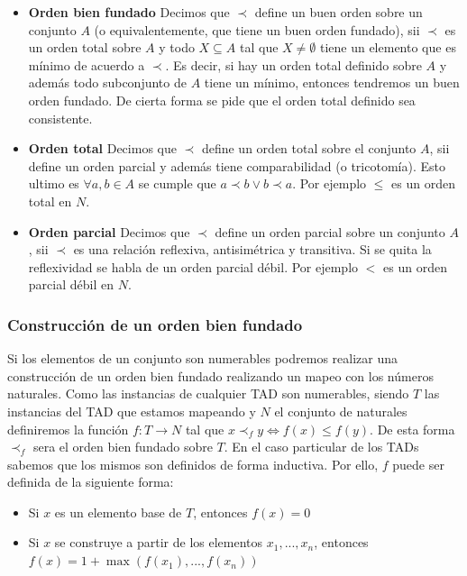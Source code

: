 \documentclass[10pt, a4paper]{report}
\begin{document}
\begin{itemize}
 \item \textbf{Orden bien fundado} Decimos que $\prec$ define un buen orden sobre un conjunto $A$ (o equivalentemente, que tiene un buen orden fundado), sii $\prec$ es un orden total sobre $A$ y todo $X \subseteq A$ tal que $X \not= \emptyset$ tiene un elemento que es m\'inimo de acuerdo a $\prec$. Es decir, si hay un orden total definido sobre $A$ y adem\'as todo subconjunto de $A$ tiene un m\'inimo, entonces tendremos un buen orden fundado. De cierta forma se pide que el orden total definido sea consistente.
 \item \textbf{Orden total} Decimos que $\prec$ define un orden total sobre el conjunto $A$, sii define un orden parcial y adem\'as tiene comparabilidad (o tricotom\'ia). Esto ultimo es $\forall a,b \in A$ se cumple que $a\prec b \lor b\prec a$. Por ejemplo $\leq$ es un orden total en $N$. 
 \item \textbf{Orden parcial} Decimos que $\prec$ define un orden parcial sobre un conjunto $A$, sii $\prec$ es una relaci\'on reflexiva, antisim\'etrica y transitiva. Si se quita la reflexividad se habla de un orden parcial d\'ebil. Por ejemplo $<$ es un orden parcial d\'ebil en $N$.
\end{itemize}

\subsubsection{Construcci\'on de un orden bien fundado}

Si los elementos de un conjunto son numerables podremos realizar una construcci\'on de un orden bien fundado realizando un mapeo con los n\'umeros naturales. Como las instancias de cualquier TAD son numerables, siendo $T$ las instancias del TAD que estamos mapeando y $N$ el conjunto de naturales definiremos la funci\'on $f: T \rightarrow N$ tal que $x \prec_f y \iff f(x) \leq f(y)$. De esta forma $\prec_f$ sera el orden bien fundado sobre $T$. En el caso particular de los TADs sabemos que los mismos son definidos de forma inductiva. Por ello, $f$ puede ser definida de la siguiente forma:
\begin{itemize}
 \item Si $x$ es un elemento base de $T$, entonces $f(x)=0$
 \item Si $x$ se construye a partir de los elementos $x_1,...,x_n$, entonces $f(x)=1+\max(f(x_1),...,f(x_n))$
\end{itemize}
\end{document}
